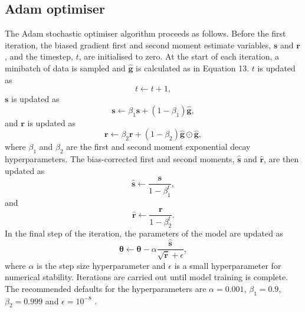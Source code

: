 \documentclass[12pt]{article}
\begin{document}
\subsection{Adam optimiser}
The Adam stochastic optimiser algorithm proceeds as follows. Before the first iteration, the biased gradient first and second moment estimate variables, $\bm{s}$ and $\bm{r}$, and the timestep, $t$, are initialised to zero. At the start of each iteration, a minibatch of data is sampled and $\hat{\bm{g}}$ is calculated as in Equation 13. $t$ is updated as
\begin{equation}
t\leftarrow t+1,
\end{equation}
$\bm{s}$ is updated as
\begin{equation}
\bm{s}\leftarrow \beta_1\bm{s}+(1-\beta_1)\hat{\bm{g}},
\end{equation}
and $\bm{r}$ is updated as
\begin{equation}
\bm{r}\leftarrow \beta_2\bm{r}+(1-\beta_2)\hat{\bm{g}}\odot\hat{\bm{g}},
\end{equation}
where $\beta_1$ and $\beta_2$ are the first and second moment exponential decay hyperparameters. The bias-corrected first and second moments, $\hat{\bm{s}}$ and $\hat{\bm{r}}$, are then updated as
\begin{equation}
\hat{\bm{s}}\leftarrow \frac{\bm{s}}{1-\beta_1^t},
\end{equation}    
and
\begin{equation}
\hat{\bm{r}}\leftarrow \frac{\bm{r}}{1-\beta_2^t}.
\end{equation}
In the final step of the iteration, the parameters of the model are updated as
\begin{equation}
\bm{\theta}\leftarrow \bm{\theta}-\alpha\frac{\hat{\bm{s}}}{\sqrt{\hat{\bm{r}}}+\epsilon},
\end{equation}
where $\alpha$ is the step size hyperparameter and $\epsilon$ is a small hyperparameter for numerical stability. Iterations are carried out until model training is complete. The recommended defaults for the hyperparameters are $\alpha=0.001$, $\beta_1=0.9$, $\beta_2=0.999$ and $\epsilon=10^{-8}$ \cite{Kingma14}.     
\end{document}
